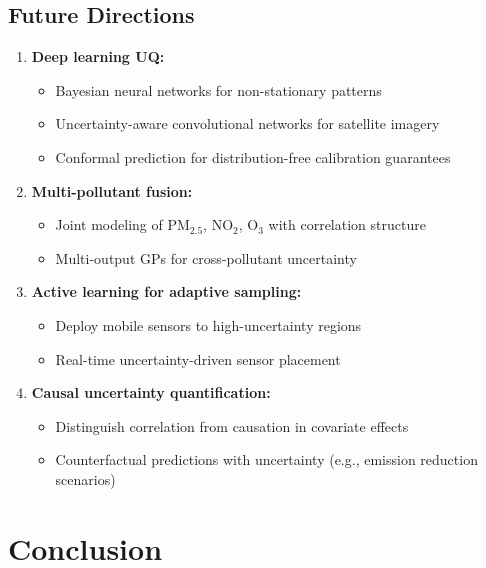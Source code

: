 \documentclass[11pt,letterpaper]{article}
\begin{document}
\subsection{Future Directions}

\begin{enumerate}
    \item \textbf{Deep learning UQ:}
    \begin{itemize}
        \item Bayesian neural networks for non-stationary patterns
        \item Uncertainty-aware convolutional networks for satellite imagery
        \item Conformal prediction for distribution-free calibration guarantees
    \end{itemize}

    \item \textbf{Multi-pollutant fusion:}
    \begin{itemize}
        \item Joint modeling of PM$_{2.5}$, NO$_2$, O$_3$ with correlation structure
        \item Multi-output GPs for cross-pollutant uncertainty
    \end{itemize}

    \item \textbf{Active learning for adaptive sampling:}
    \begin{itemize}
        \item Deploy mobile sensors to high-uncertainty regions
        \item Real-time uncertainty-driven sensor placement
    \end{itemize}

    \item \textbf{Causal uncertainty quantification:}
    \begin{itemize}
        \item Distinguish correlation from causation in covariate effects
        \item Counterfactual predictions with uncertainty (e.g., emission reduction scenarios)
    \end{itemize}
\end{enumerate}

\section{Conclusion} \label{sec:conclusion}
\end{document}
